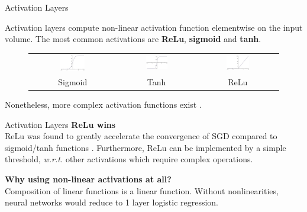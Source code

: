 \documentclass[aspectratio=169]{beamer}
\begin{document}
\begin{frame}{Activation Layers}

Activation layers compute non-linear activation function elementwise on the input volume. The most common activations are \textbf{ReLu}, \textbf{sigmoid} and \textbf{tanh}.
\begin{figure}
\begin{tabular}{ccc}
\includegraphics[width=0.3\textwidth]{img/cnn/act_sigmoid.jpg}&
\includegraphics[width=0.3\textwidth]{img/cnn/act_tanh.jpg} & 
\includegraphics[width=0.3\textwidth]{img/cnn/act_relu.jpg}\\
Sigmoid & Tanh & ReLu
\end{tabular}
\end{figure}
Nonetheless, more complex activation functions exist \cite{he2015delving,goodfellow2013maxout}.
\end{frame}


\begin{frame}{Activation Layers}
\textbf{ReLu wins}\\
ReLu was found to greatly accelerate the convergence of SGD compared to sigmoid/tanh functions \cite{krizhevsky2012imagenet}. Furthermore, ReLu can be implemented by a simple threshold, \emph{w.r.t.} other activations which require complex operations.

\textbf{Why using non-linear activations at all?}\\
Composition of linear functions is a linear function. Without nonlinearities, neural networks would reduce to 1 layer logistic regression.

\end{frame}
\end{document}
